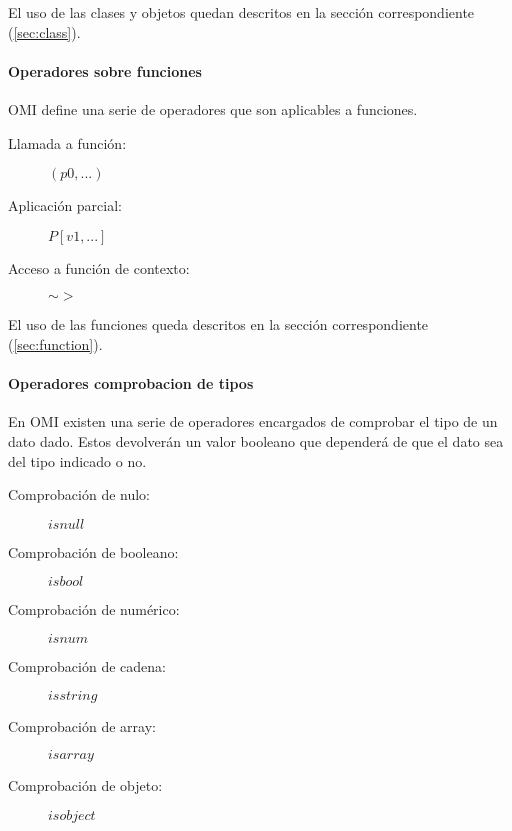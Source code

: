 El uso de las clases y objetos quedan descritos en la sección correspondiente (\autoref{sec:class}).


\paragraph{Operadores sobre funciones} \label{sec:op_func}

OMI define una serie de operadores que son aplicables a funciones. 


\begin{description}
\item [Llamada a función:] $(p0,...)$
\item [Aplicación parcial:] $P[v1,...]$
\item [Acceso a función de contexto:] $\sim>$
\end{description} 

El uso de las funciones queda descritos en la sección correspondiente (\autoref{sec:function}).



\paragraph{Operadores comprobacion de tipos} \label{sec:op_typecheck}
En OMI existen una serie de operadores encargados de comprobar el tipo de un dato dado. Estos devolverán
un valor booleano que dependerá de que el dato sea del tipo indicado o no.

\begin{description}
\item [Comprobación de nulo:] $isnull$
\item [Comprobación de booleano:] $isbool$
\item [Comprobación de numérico:] $isnum$
\item [Comprobación de cadena:] $isstring$
\item [Comprobación de array:] $isarray$
\item [Comprobación de objeto:] $isobject$
\end{description} 

